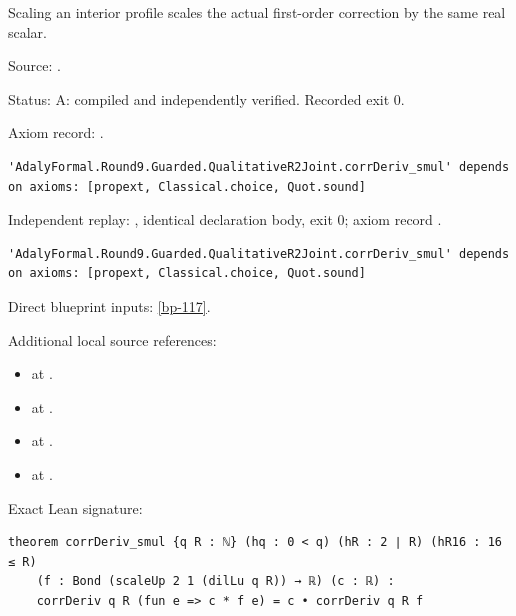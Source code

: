 \begin{theorem}[bp-124]
\label{bp-124}
\leanok
Scaling an interior profile scales the actual first-order correction by the same real scalar.

\par Source: \texttt{}.
\par Status: A: compiled and independently verified. Recorded exit 0.
\par Axiom record: \texttt{}.
\begin{verbatim}
'AdalyFormal.Round9.Guarded.QualitativeR2Joint.corrDeriv_smul' depends on axioms: [propext, Classical.choice, Quot.sound]
\end{verbatim}
\par Independent replay: \texttt{}, identical declaration body, exit 0; axiom record \texttt{}.
\begin{verbatim}
'AdalyFormal.Round9.Guarded.QualitativeR2Joint.corrDeriv_smul' depends on axioms: [propext, Classical.choice, Quot.sound]
\end{verbatim}
\par Direct blueprint inputs: \ref{bp-117}.
\par Additional local source references:
\begin{itemize}
\item \texttt{} at \texttt{}.
\item \texttt{} at \texttt{}.
\item \texttt{} at \texttt{}.
\item \texttt{} at \texttt{}.
\end{itemize}
\par Exact Lean signature:
\begin{verbatim}
theorem corrDeriv_smul {q R : ℕ} (hq : 0 < q) (hR : 2 ∣ R) (hR16 : 16 ≤ R)
    (f : Bond (scaleUp 2 1 (dilLu q R)) → ℝ) (c : ℝ) :
    corrDeriv q R (fun e => c * f e) = c • corrDeriv q R f
\end{verbatim}
\end{theorem}


